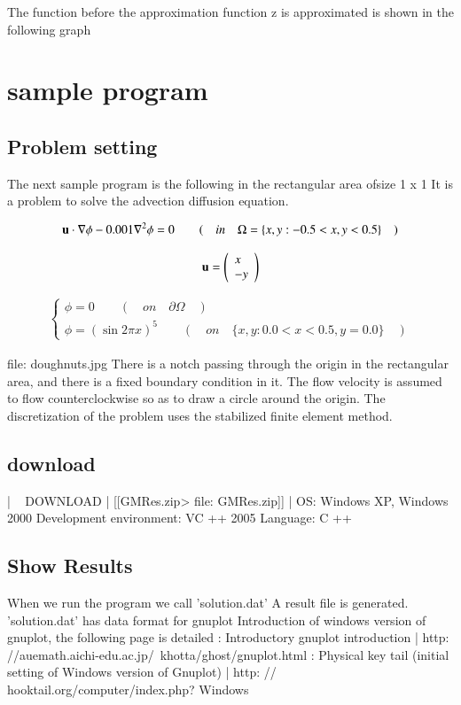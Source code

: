 The function before the approximation function z is approximated is shown in the following graph




\section{sample program}

\subsection{Problem setting}
The next sample program is the following in the rectangular area of ​​size 1 x 1
It is a problem to solve the advection diffusion equation.

\begin{equation}
\mathbf{u}\cdot\nabla\phi-0.001{\nabla}^2\phi=0 \qquad ( \quad in \quad \Omega = \{x,y:-0.5<x,y<0.5 \} \quad )
\end{equation}


\begin{eqnarray}
\mathbf{u}=\left(
\begin{array}{l}
x\\
-y
\end{array}\right)
\end{eqnarray}


\begin{eqnarray}
\left\{\begin{array}{l}
\phi=0 \qquad ( \quad on \quad \partial\Omega \quad ) \\
\phi=(\sin2\pi x)^5 \qquad ( \quad on \quad \{x,y:0.0<x<0.5,y=0.0 \} \quad)
\end{array}\right.
\end{eqnarray}

file: doughnuts.jpg
There is a notch passing through the origin in the rectangular area, and there is a fixed boundary condition in it.
The flow velocity is assumed to flow counterclockwise so as to draw a circle around the origin.
The discretization of the problem uses the stabilized finite element method.


\subsection{download}
| ~ DOWNLOAD | [[GMRes.zip> file: GMRes.zip]] |
 OS: Windows XP, Windows 2000
 Development environment: VC ++ 2005
 Language: C ++
 
 

\subsection{Show Results}
When we run the program we call 'solution.dat'
A result file is generated.
'solution.dat' has data format for gnuplot
Introduction of windows version of gnuplot, the following page is detailed
: Introductory gnuplot introduction | http: //auemath.aichi-edu.ac.jp/~khotta/ghost/gnuplot.html
: Physical key tail (initial setting of Windows version of Gnuplot) | http: // hooktail.org/computer/index.php? Windows%


